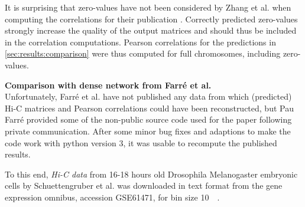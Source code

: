 It is surprising that zero-values have not been considered by Zhang et al. when computing the correlations for their publication \cite{Zhang2019}.
Correctly predicted zero-values strongly increase the quality of the output matrices 
and should thus be included in the correlation computations.
Pearson correlations for the predictions in \cref{sec:results:comparison} were thus computed for full chromosomes, including zero-values.

\textbf{Comparison with dense network from Farr\'e et al.}\\
Unfortunately, Farr\'e et al. have not published any data from which (predicted) Hi-C matrices and Pearson correlations could have been reconstructed,
but Pau Farr\'e provided some of the non-public source code used for the paper \cite{Farre2018a} following private communication.
After some minor bug fixes and adaptions to make the code work with python version 3, it was usable to recompute the published results.

To this end, \emph{Hi-C data} from 16-18 hours old Drosophila Melanogaster embryonic cells by Schuettengruber et al. \cite{Schuettengruber2014} 
was downloaded in text format from  the gene expression omnibus, accession GSE61471, for bin size \SI{10}{\kilo\bp}.

